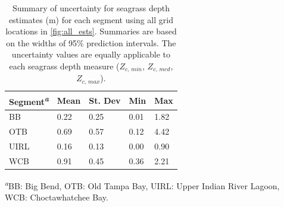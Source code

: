 \documentclass[letterpaper,12pt,oneside]{article}\usepackage[]{graphicx}\usepackage[]{color}
\begin{document}
\begin{table}[!tbp]
\caption{Summary of uncertainty for seagrass depth estimates (m) for each segment using all grid locations in \cref{fig:all_ests}.  Summaries are based on the widths of 95\% prediction intervals.  The uncertainty values are equally applicable to each seagrass depth measure ($Z_{c,\,min}$, $Z_{c,\,med}$, $Z_{c,\,max}$).\label{tab:sens_summ}} 
\begin{center}
\begin{tabular}{lllll}
\hline\hline
\multicolumn{1}{l}{Segment\textsuperscript{\textit{a}}}&\multicolumn{1}{c}{Mean}&\multicolumn{1}{c}{St. Dev}&\multicolumn{1}{c}{Min}&\multicolumn{1}{c}{Max}\tabularnewline
\hline
BB&0.22&0.25&0.01&1.82\tabularnewline
OTB&0.69&0.57&0.12&4.42\tabularnewline
UIRL&0.16&0.13&0.00&0.90\tabularnewline
WCB&0.91&0.45&0.36&2.21\tabularnewline
\hline
\end{tabular}\end{center}

\textsuperscript{\textit{a}}\footnotesize BB: Big Bend, OTB: Old Tampa Bay, UIRL: Upper Indian River Lagoon, WCB: Choctawhatchee Bay.\end{table}
\end{document}

